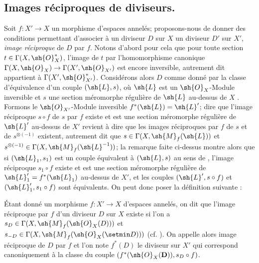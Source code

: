 \subsection{Images réciproques de diviseurs.}
\label{IV.21.4}

\begin{env}[21.4.1]
Soit $f:X'\to X$ un morphisme d'espaces annelés;
proposons-nous de donner des conditions permettant d'associer à un diviseur $D$ sur $X$ un diviseur $D'$ sur $X'$, \emph{image réciproque} de $D$ par $f$.
Notons d'abord pour cela que pour toute section $t\in\Gamma(X,\sh{O}_X^*)$, l'image de $t$ par l'homomorphisme canonique $\Gamma(X,\sh{O}_X)\to\Gamma(X',\sh{O}_{X'})$ est encore inversible, autrement dit appartient à $\Gamma(X',\sh{O}_{X'}^*)$.
Considérons alors $D$ comme donné par la classe d'équivalence d'un couple $(\sh{L},s)$, où $\sh{L}$ est un $\sh{O}_X$-Module inversible et $s$ une section méromorphe régulière de $\sh{L}$ au-dessus de $X$ .
Formons le $\sh{O}_{X'}$-Module inversible $f^*(\sh{L})=\sh{L}'$;
dire que l'image réciproque $s\circ f$ de $s$ par $f$ existe  et est une section méromorphe régulière de $\sh{L}'$ au-dessus de $X'$ revient à dire que les images réciproques par $f$ de $s$ et de $s^{\otimes(-1)}$ existent, autrement dit que $s\in\Gamma(X,\sh{M}_f(\sh{L}))$ et $s^{\otimes(-1)}\in\Gamma(X,\sh{M}_f(\sh{L}^{-1}))$;
la remarque faite ci-dessus montre alors que si $(\sh{L}_1,s_1)$ est un couple équivalent à $(\sh{L},s)$ au sens de , l'image réciproque $s_1\circ f$ existe et est une section méromorphe régulière de $\sh{L}_1'=f^*(\sh{L}_1)$ au-dessus de $X'$, et les couples $(\sh{L}',s\circ f)$ et $(\sh{L}_1',s_1\circ f)$ sont équivalents.
On peut donc poser la définition suivante :
\end{env}

\begin{definition}[21.4.2]
Étant donné un morphisme $f:X'\to X$ d'espaces annelés, on dit que l'image réciproque par $f$ d'un diviseur $D$ sur $X$ existe si l'on a $s_D\in\Gamma(X,\sh{M}_f(\sh{O}_X(D)))$ et $s_{-D}\in\Gamma(X,\sh{M}_f(\sh{O}_X(\setmin D)))$ \textup{(cf. )}.
On appelle alors image réciproque de $D$ par $f$ et l'on note $f^*(D)$ le diviseur sur $X'$ qui correspond canoniquement  à la classe du couple $(f^*(\sh{O}_X(\mathbf{D})),s_D\circ f)$.
\end{definition}

